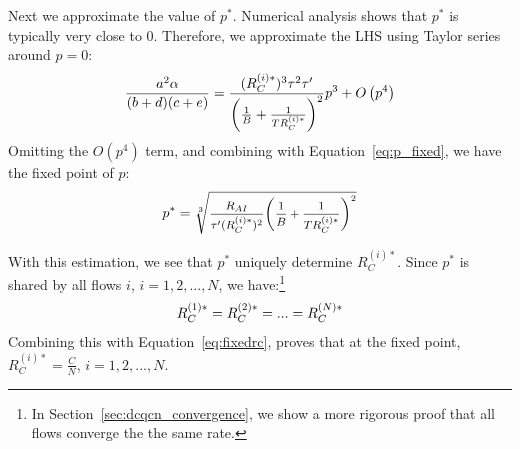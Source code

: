 Next we approximate the value of $p^*$. Numerical analysis shows that $p^*$ is 
typically very close to 0. Therefore, we approximate the LHS using Taylor series around $p=0$:
\begin{equation}
\small
\frac{{{a^2}\alpha }}{{(b + d)(c + e)}} = \frac{{(R_C^{(i)*})^3{\tau ^2}\tau '}}{{{{\left( {\frac{1}{B} + \frac{1}{{TR_C^{(i)*}}}} \right)}^2}}}{p^3} + O\left( {{p^4}} \right)
\end{equation}
Omitting the $O(p^4)$ term, and combining with Equation~\ref{eq:p_fixed}, we have the fixed point of $p$:
\begin{equation}
\small
{p^*} = \sqrt[3]{{\frac{{{R_{AI}}}}{{{\tau '}(R_C^{(i)*})^2}}{{\left( {\frac{1}{B} + \frac{1}{TR_C^{(i)*}}} \right)}^2}}}
\label{eq:fixedp}
\end{equation}

With this estimation, we see that $p^*$ uniquely determine $R_C^{(i)*}$. 
Since $p^*$ is shared by all flows $i$, $i = 1, 2, ..., N$, we have:\footnote{In 
Section~\ref{sec:dcqcn_convergence}, we show a more rigorous proof that all flows
converge the the same rate.}
\begin{equation}
\small
R_C^{(1)*} = R_C^{(2)*} = ... = R_C^{(N)*}
\end{equation}
Combining this with Equation~\ref{eq:fixedrc}, proves that at the fixed point, $R_C^{(i)*} = \frac{C}{N}$, 
$i = 1, 2, ..., N$.

